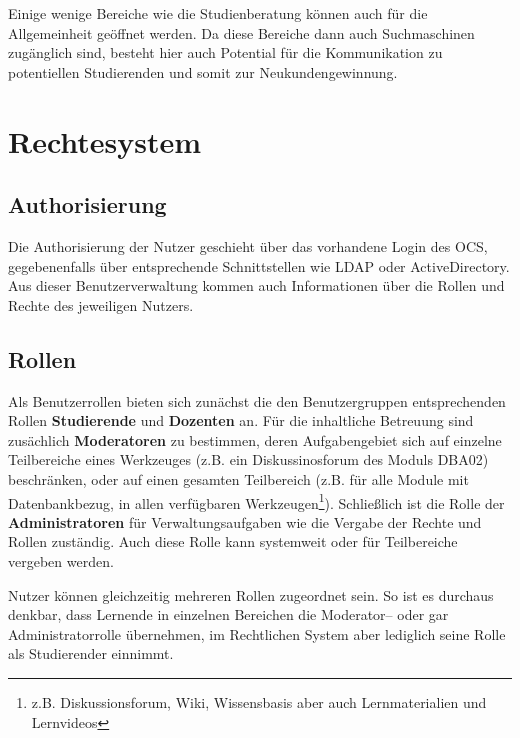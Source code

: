Einige wenige Bereiche wie die Studienberatung können auch für die Allgemeinheit geöffnet werden. Da diese Bereiche dann auch Suchmaschinen zugänglich sind, besteht hier auch Potential für die Kommunikation zu potentiellen Studierenden und somit zur Neukundengewinnung.

\newpage
\section{Rechtesystem} %
\label{sec:rechtesystem}

\subsection{Authorisierung} %
\label{sub:authorisierung}
Die Authorisierung der Nutzer geschieht über das vorhandene Login des \ac{OCS}, gegebenenfalls über entsprechende Schnittstellen wie \ac{LDAP} oder ActiveDirectory. Aus dieser Benutzerverwaltung kommen auch Informationen über die Rollen und Rechte des jeweiligen Nutzers. 

\subsection{Rollen} %
\label{sub:rollen}
Als Benutzerrollen bieten sich zunächst die den Benutzergruppen entsprechenden Rollen \textbf{Studierende} und \textbf{Dozenten} an. Für die inhaltliche Betreuung sind zusächlich \textbf{Moderatoren} zu bestimmen, deren Aufgabengebiet sich auf einzelne Teilbereiche eines Werkzeuges (z.B. ein Diskussinosforum des Moduls DBA02) beschränken, oder auf einen gesamten Teilbereich (z.B. für alle Module mit Datenbankbezug, in allen verfügbaren Werkzeugen\footnote{z.B. Diskussionsforum, Wiki, Wissensbasis aber auch Lernmaterialien und Lernvideos}). Schließlich ist die Rolle der \textbf{Administratoren} für Verwaltungsaufgaben wie die Vergabe der Rechte und Rollen zuständig. Auch diese Rolle kann systemweit oder für Teilbereiche vergeben werden. 

Nutzer können gleichzeitig mehreren Rollen zugeordnet sein. So ist es durchaus denkbar, dass Lernende in einzelnen Bereichen die Moderator– oder gar Administratorrolle übernehmen, im Rechtlichen System aber lediglich seine Rolle als Studierender einnimmt.

